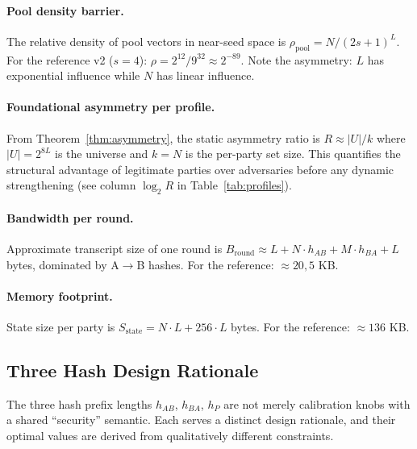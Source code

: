 \documentclass[11pt,a4paper]{article}
\begin{document}
\paragraph{Pool density barrier.} The relative density of pool vectors in near-seed space is $\rho_{\text{pool}} = N / (2s+1)^L$. For the reference v2 ($s = 4$): $\rho = 2^{12}/9^{32} \approx 2^{-89}$. Note the asymmetry: $L$ has exponential influence while $N$ has linear influence.

\paragraph{Foundational asymmetry per profile.} From Theorem~\ref{thm:asymmetry}, the static asymmetry ratio is $R \approx |U|/k$ where $|U| = 2^{8L}$ is the universe and $k = N$ is the per-party set size. This quantifies the structural advantage of legitimate parties over adversaries before any dynamic strengthening (see column $\log_2 R$ in Table~\ref{tab:profiles}).

\paragraph{Bandwidth per round.} Approximate transcript size of one round is $B_{\text{round}} \approx L + N \cdot h_{AB} + M \cdot h_{BA} + L$ bytes, dominated by A$\to$B hashes. For the reference: $\approx 20{,}5$ KB.

\paragraph{Memory footprint.} State size per party is $S_{\text{state}} = N \cdot L + 256 \cdot L$ bytes. For the reference: $\approx 136$ KB.

\subsection{Three Hash Design Rationale}\label{sec:rationale}

The three hash prefix lengths $h_{AB}$, $h_{BA}$, $h_P$ are not merely calibration knobs with a shared ``security'' semantic. Each serves a distinct design rationale, and their optimal values are derived from qualitatively different constraints.
\end{document}
